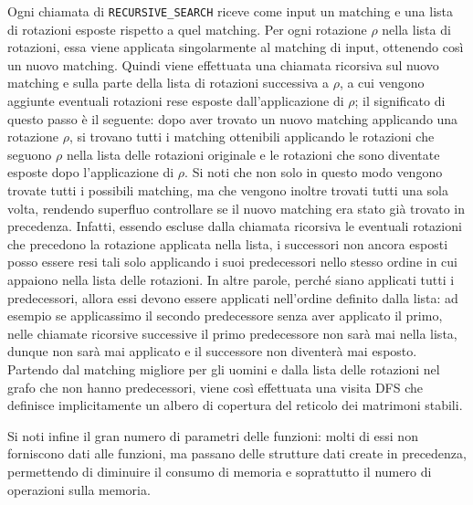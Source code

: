 \documentclass[12pt]{article}
\begin{document}
    Ogni chiamata di \texttt{RECURSIVE\_SEARCH} riceve come input un matching e una lista di rotazioni esposte rispetto a quel matching. Per ogni rotazione $\rho$ nella lista di rotazioni, essa viene applicata singolarmente al matching di input, ottenendo così un nuovo matching. Quindi viene effettuata una chiamata ricorsiva sul nuovo matching e sulla parte della lista di rotazioni successiva a $\rho$, a cui vengono aggiunte eventuali rotazioni rese esposte dall'applicazione di $\rho$; il significato di questo passo è il seguente: dopo aver trovato un nuovo matching applicando una rotazione $\rho$, si trovano tutti i matching ottenibili applicando le rotazioni che seguono $\rho$ nella lista delle rotazioni originale e le rotazioni che sono diventate esposte dopo l'applicazione di $\rho$. Si noti che non solo in questo modo vengono trovate tutti i possibili matching, ma che vengono inoltre trovati tutti una sola volta, rendendo superfluo controllare se il nuovo matching era stato già trovato in precedenza. Infatti, essendo escluse dalla chiamata ricorsiva le eventuali rotazioni che precedono la rotazione applicata nella lista, i successori non ancora esposti posso essere resi tali solo applicando i suoi predecessori nello stesso ordine in cui appaiono nella lista delle rotazioni. In altre parole, perché siano applicati tutti i predecessori, allora essi devono essere applicati nell'ordine definito dalla lista: ad esempio se applicassimo il secondo predecessore senza aver applicato il primo, nelle chiamate ricorsive successive il primo predecessore non sarà mai nella lista, dunque non sarà mai applicato e il successore non diventerà mai esposto. Partendo dal matching migliore per gli uomini e dalla lista delle rotazioni nel grafo che non hanno predecessori, viene così effettuata una visita DFS che definisce implicitamente un albero di copertura del reticolo dei matrimoni stabili.

    Si noti infine il gran numero di parametri delle funzioni: molti di essi non forniscono dati alle funzioni, ma passano delle strutture dati create in precedenza, permettendo di diminuire il consumo di memoria e soprattutto il numero di operazioni sulla memoria.
\end{document}
